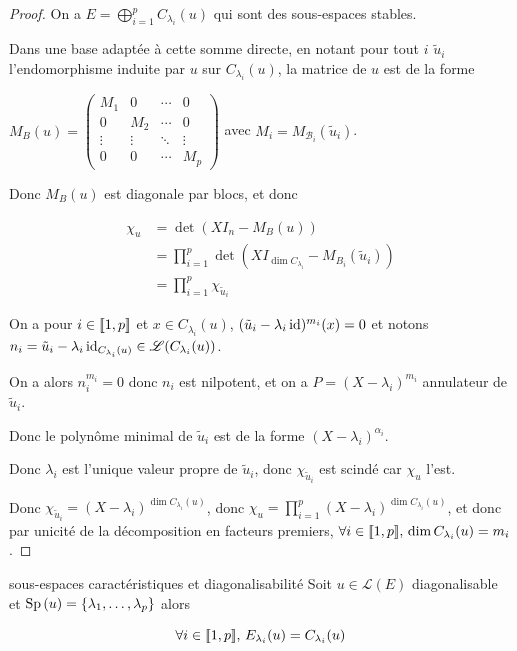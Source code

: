 \begin{proof}
    On a $E = \displaystyle \bigoplus_{i = 1 }^{ p } C_{\lambda_i}(u)$ qui sont 
    des sous-espaces stables. 

    Dans une base adaptée à cette somme directe, en notant pour tout $i$ 
    $\tilde u_i$ l'endomorphisme induite par $u$ sur $C_{\lambda_i}(u)$, la 
    matrice de $u$ est de la forme

    $M_B(u) = \begin{pmatrix}
        M_1 & 0 & \cdots & 0 \\
        0 & M_2 & \cdots & 0 \\
        \vdots & \vdots & \ddots & \vdots \\
        0 & 0 & \cdots & M_p
    \end{pmatrix}$ avec $M_i = M_{\mathcal B_i}(\tilde u_i)$.

    Donc $M_B(u)$ est diagonale par blocs, et donc 

    \begin{align}
        \chi_u & = \det (X I_n - M_B(u)) \\
        & = \prod_{i = 1 }^{ p } \det (X I_{\dim C_{\lambda_i}} - M_{B_i}(\tilde u_i)) \\
        & = \prod_{i = 1 }^{ p } \chi_{\tilde u_i}
    \end{align}

    On a pour $i \in [\![1, p]\!]$ et $x \in C_{\lambda_i}(u)$,
    $(\tilde u_i - \lambda_i \operatorname{id})^{m_i}(x) = 0$ et notons $n_i = \tilde u_i - \lambda_i \operatorname{id}_{C_{\lambda_i}(u)} \in \mathscr L(C_{\lambda_i}(u))$.

    On a alors $n_i^{m_i} = 0$ donc $n_i$ est nilpotent, et on a 
    $P = (X - \lambda_i)^{m_i}$ annulateur de $\tilde u_i$.

    Donc le polynôme minimal de $\tilde u_i$ est de la forme $(X - \lambda_i)^{\alpha_i}$.

    Donc $\lambda_i$ est l'unique valeur propre de $\tilde u_i$, donc $\chi_{\tilde u_i}$ 
    est scindé car $\chi_u$ l'est. 

    Donc $\chi_{\tilde u_i} = (X - \lambda_i)^{\dim C_{\lambda_i}(u)}$, donc 
    $\displaystyle \chi_u = \prod_{i = 1 }^{ p } (X - \lambda_i)^{\dim C_{\lambda_i}(u)}$, 
    et donc par unicité de la décomposition en facteurs premiers,
    $\forall i \in [\![1, p]\!], \, \dim C_{\lambda_i}(u) = m_i$.
\end{proof}

\begin{corollaire}{sous-espaces caractéristiques et diagonalisabilité}{}
    Soit $u \in \mathscr L(E)$ diagonalisable et $\operatorname{Sp} \, (u) = \{\lambda_1, \ldots, \lambda_p\}$
    alors 
    
    $$\forall i \in [\![1, p]\!], \, E_{\lambda_i}(u) = C_{\lambda_i}(u)$$
\end{corollaire}

